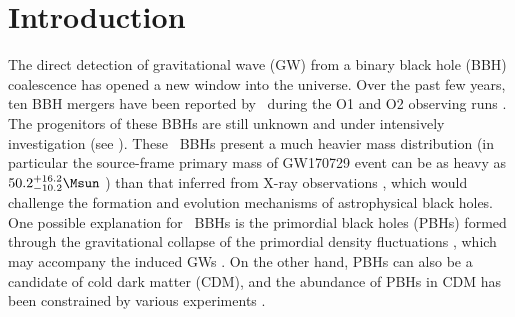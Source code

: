 \documentclass[
reprint,           %
superscriptaddress,%
amsmath,           %
amssymb,           %
aps,               %
prd,               %
notitlepage,       %
longbibliography,  %
floatfix,          %
showkeys,          %
]{revtex4-1}
\begin{document}
	
\maketitle

\section{Introduction}
The direct detection of gravitational wave (GW) from a binary black hole (BBH)
coalescence \cite{Abbott:2016blz} has opened a new window into the universe.
Over the past few years, ten BBH mergers have been reported by \lvc\ during 
the O1 and O2 observing runs \cite{Abbott:2016blz,Abbott:2016nmj,%
TheLIGOScientific:2016pea,Abbott:2017vtc,%
Abbott:2017gyy,Abbott:2017oio,LIGOScientific:2018mvr}.
The progenitors of these BBHs are still unknown and under intensively investigation (see \eg \cite{Bird:2016dcv,Sasaki:2016jop,Chen:2018czv,%
Fishbach:2017dwv,Clesse:2016vqa,Antonini:2016gqe,%
Inayoshi:2017mrs,Ali-Haimoud:2017rtz,Perna:2019axr,Kavanagh:2018ggo,%
Rodriguez:2015oxa,Rodriguez:2016kxx,Park:2017zgj,%
Belczynski:2014iua,Belczynski:2016obo,Woosley:2016nnw,%
Rodriguez:2018rmd,Choksi:2018jnq,2010AIPC.1314..291D,deMink:2016vkw}).
These \lvc\ BBHs present a much heavier mass distribution (in particular the 
source-frame primary mass of GW170729 event can be as heavy as
$50.2^{+16.2}_{-10.2} \Msun$ \cite{LIGOScientific:2018mvr}) than that 
inferred from X-ray observations
\cite{Wiktorowicz:2013dua,Casares:2013tpa,Corral-Santana:2013uua,%
Corral-Santana:2015fud},
which would challenge the formation and evolution mechanisms of astrophysical
black holes. 
One possible explanation for \lvc\ BBHs is the primordial black holes (PBHs)
\cite{Bird:2016dcv,Sasaki:2016jop,Chen:2018czv}
formed through the gravitational collapse of the primordial density
fluctuations \cite{Hawking:1971ei,Carr:1974nx}, 
which may accompany the induced GWs
\cite{Yuan:2019udt,Yuan:2019wwo,Chen:2019xse,Yuan:2019fwv,Cai:2019bmk,Cai:2018dig,Cai:2019elf,DeLuca:2019ufz,Bartolo:2018rku,Bartolo:2018evs}.
On the other hand, PBHs can also be a candidate of cold dark matter (CDM),
and the abundance of PBHs in CDM has been constrained by various experiments
\cite{Carr:2009jm,Barnacka:2012bm,Graham:2015apa,Niikura:2017zjd,%
Griest:2013esa,Niikura:2019kqi,Tisserand:2006zx,Brandt:2016aco,Gaggero:2016dpq,%
Ali-Haimoud:2016mbv,Blum:2016cjs,Horowitz:2016lib,Chen:2016pud,%
Wang:2016ana,Abbott:2018oah,Magee:2018opb,Wang:2019kaf,Chen:2018rzo,Chen:2019irf,%
Yuan:2019udt,Chen:2019xse,Montero-Camacho:2019jte,Laha:2019ssq,Dasgupta:2019cae,Gow:2019pok}.
\end{document}
